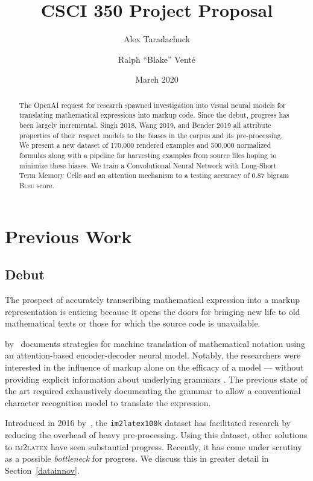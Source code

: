 \documentclass{article}
\title{\TeXNet{} \textbar{} CSCI 350 Project Proposal}
\author{Alex Taradachuck \and Ralph ``Blake'' Vent\'{e}}
\date{March 2020}
\newcommand{\BLEU}{\textsc{Bleu}}
\begin{document}
\maketitle

\begin{abstract}
  The OpenAI request for research spawned investigation into visual neural
  models for translating mathematical expressions into markup code. Since the
  debut, progress has been largely incremental. Singh 2018, Wang 2019, and
  Bender 2019 all attribute properties of their respect models to the biases in
  the corpus and its pre-processing. We present a new dataset of 170,000
  rendered examples and 500,000 normalized formulas along with a pipeline for
  harvesting examples from source files hoping to minimize these biases. We
  train a Convolutional Neural Network with Long-Short Term Memory Cells and an
  attention mechanism to a testing accuracy of 0.87 bigram \BLEU{} score.
\end{abstract}

\tableofcontents
\section{Previous Work}

\subsection{Debut}

The prospect of accurately transcribing mathematical expression into a markup
representation is enticing because it opens the doors for bringing new life to
old mathematical texts or those for which the source code is unavailable.

 by~\citeauthor{deng2016you}
documents strategies for machine translation of mathematical notation using an
attention-based encoder-decoder neural model. Notably, the researchers were
interested in the influence of markup alone on the efficacy of a model ---
without providing explicit information about underlying grammars
\parencite[1]{deng2016you}. The previous state of the art required exhaustively
documenting the grammar to allow a conventional character recognition model to
translate the expression.

Introduced in 2016 by~\citeauthor{deng2016you}, the \texttt{im2latex100k} dataset has
facilitated research by reducing the overhead of heavy pre-processing. Using
this dataset, other solutions to \textsc{im2latex} have seen substantial
progress. Recently, it has come under scrutiny as a possible \textit{bottleneck} for
progress. We discuss this in greater detail in Section~\ref{datainnov}.
\end{document}
